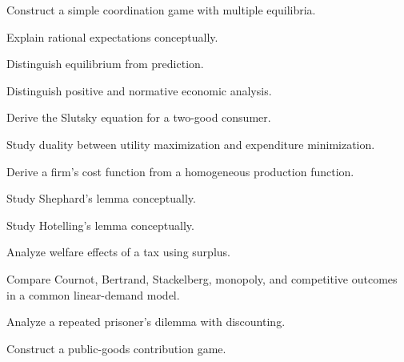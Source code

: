 \begin{exercise}[3]
Construct a simple coordination game with multiple equilibria.
\end{exercise}

\begin{exercise}[3]
Explain rational expectations conceptually.
\end{exercise}

\begin{exercise}[3]
Distinguish equilibrium from prediction.
\end{exercise}

\begin{exercise}[3]
Distinguish positive and normative economic analysis.
\end{exercise}

\begin{exercise}[4]
Derive the Slutsky equation for a two-good consumer.
\end{exercise}

\begin{exercise}[4]
Study duality between utility maximization and expenditure minimization.
\end{exercise}

\begin{exercise}[4]
Derive a firm's cost function from a homogeneous production function.
\end{exercise}

\begin{exercise}[4]
Study Shephard's lemma conceptually.
\end{exercise}

\begin{exercise}[4]
Study Hotelling's lemma conceptually.
\end{exercise}

\begin{exercise}[4]
Analyze welfare effects of a tax using surplus.
\end{exercise}

\begin{exercise}[4]
Compare Cournot, Bertrand, Stackelberg, monopoly, and competitive outcomes
in a common linear-demand model.
\end{exercise}

\begin{exercise}[4]
Analyze a repeated prisoner's dilemma with discounting.
\end{exercise}

\begin{exercise}[4]
Construct a public-goods contribution game.
\end{exercise}


